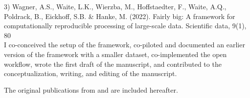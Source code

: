 \begin{refsection}
3) Wagner, A.S., Waite, L.K., Wierzba, M., Hoffstaedter, F., Waite, A.Q., Poldrack, B., Eickhoff, S.B. \& Hanke, M. (2022). Fairly big: A framework for computationally reproducible processing of large-scale data. Scientific data, 9(1), 80\\
\forceindent I co-conceived the setup of the framework, co-piloted and documented an earlier version of the framework with a smaller dataset, co-implemented the open workflow, wrote the first draft of the manuscript, and contributed to the conceptualization, writing, and editing of the manuscript.

The original publications from \citet{Halchenko2021} and \citet{wagner2022fairly} are included hereafter.









\end{refsection}
%
